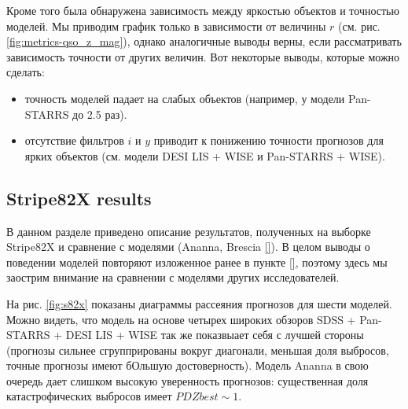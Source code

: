 \documentclass[fleqn,usenatbib]{mnras}
\begin{document}
Кроме того была обнаружена зависимость между яркостью объектов и точностью моделей. Мы приводим график только в зависимости от величины $r$ (см. рис. \ref{fig:metrics-qso_z_mag}), однако аналогичные выводы верны, если рассматривать зависимость точности от других величин. Вот некоторые выводы, которые можно сделать:
\begin{itemize}
    \item точность моделей падает на слабых объектов (например, у модели Pan-STARRS до 2.5 раз).
    \item отсутствие фильтров $i$ и $y$ приводит к понижению точности прогнозов для ярких объектов (см. модели DESI LIS + WISE и Pan-STARRS + WISE).
\end{itemize}

\subsection{Stripe82X results}\label{subsec:s82x_results}

В данном разделе приведено описание результатов, полученных на выборке Stripe82X и сравнение с моделями (Ananna, Brescia \ref{}). В целом выводы о поведении моделей повторяют изложенное ранее в пункте \ref{}, поэтому здесь мы заострим внимание на сравнении с моделями других исследователей.

На рис. \ref{fig:s82x} показаны диаграммы рассеяния прогнозов для шести моделей. Можно видеть, что модель на основе четырех широких обзоров SDSS + Pan-STARRS + DESI LIS + WISE так же показвыает себя с лучшей стороны (прогнозы сильнее сгруппрированы вокруг диагонали, меньшая доля выбросов, точные прогнозы имеют бОльшую достоверность). Модель Ananna в свою очередь дает слишком высокую уверенность прогнозов: существенная доля катастрофических выбросов имеет $PDZbest \sim 1$.
\end{document}

